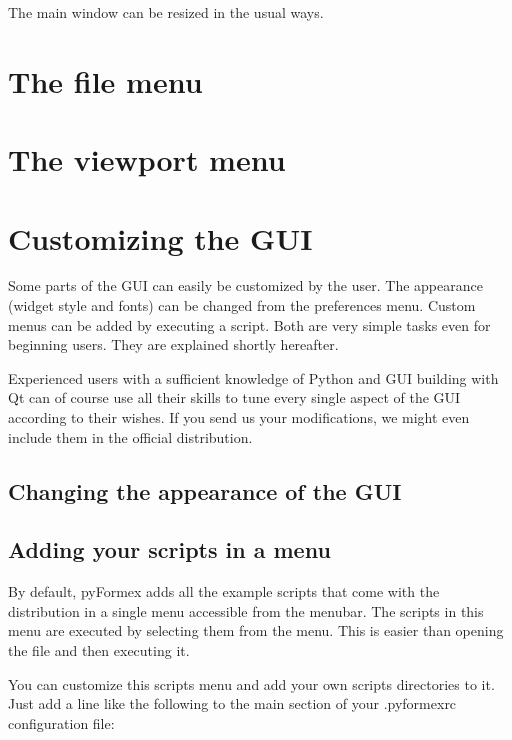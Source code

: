 The \pyf main window can be resized in the usual ways. 

   
\section{The file menu}
\label{sec:file-menu}


   
\section{The viewport menu}
\label{sec:viewport-menu}




\section{Customizing the GUI}
\label{sec:customize-gui}

Some parts of the \pyformex GUI can easily be customized by the user. 
The appearance (widget style and fonts) can be changed from the preferences menu. Custom menus can be added by executing a script. Both are very simple tasks even for beginning users. They are explained shortly hereafter.

Experienced users with a sufficient knowledge of Python and GUI building with Qt can of course use all their skills to tune every single aspect of the \pyformex GUI according to their wishes. If you send us your modifications, we might even include them in the official distribution.


\subsection{Changing the appearance of the GUI}
\label{sec:chang-appe-gui}


\subsection{Adding your scripts in a menu}
\label{sec:adding-scripts-menu}
By default, pyFormex adds all the example scripts that come with the distribution in a single menu accessible from the menubar. The scripts in this menu are executed by selecting them from the menu. This is easier than opening the file and then executing it.

You can customize this scripts menu and add your own scripts directories to it.
Just add a line like the following to the main section of your .pyformexrc configuration file:\\

